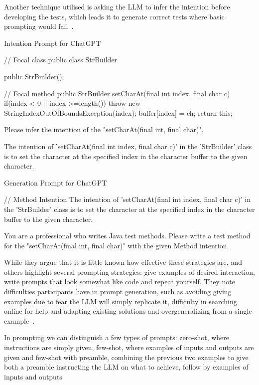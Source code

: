 Another technique utilised is asking the LLM to infer the intention before developing the tests, which leads it to generate correct tests where basic prompting would fail~\cite{kn:chattester}.

\begin{prompt}
Intention Prompt for ChatGPT

// Focal class
public class StrBuilder {
  public StrBuilder();

  // Focal method
  public StrBuilder setCharAt(final int index, final char c){
    if(index < 0 || index >=length()) {
      throw new StringIndexOutOfBoundsException(index);
    }
    buffer[index] = ch; return this;
  }
}

Please infer the intention of the "setCharAt(final int, final char)".
\end{prompt}

\begin{response}
The intention of 'setCharAt(final int index, final char c)' in the 'StrBuilder' class is to set the character at the specified index in the character buffer to the given character.
\end{response}

\begin{prompt}
Generation Prompt for ChatGPT

// Method Intention
The intention of 'setCharAt(final int index, final char c)' in the 'StrBuilder' class is to set the character at the specified index in the character buffer to the given character.

You are a professional who writes Java test methods.
Please write a test method for the "setCharAt(final int, final char)" with the given Method intention.
\end{prompt}

While they argue that it is little known how effective these strategies are, \citet{kn:johnny} and others highlight several prompting strategies: give examples of desired interaction, write prompts that look somewhat like code and repeat yourself. They note difficulties participants have in prompt generation, such as avoiding giving examples due to fear the LLM will simply replicate it, difficulty in searching online for help and adapting existing solutions and overgeneralizing from a single example~\cite{kn:johnny}.

In prompting we can distinguish a few types of prompts: zero-shot, where instructions are simply given, few-shot, where examples of inputs and outputs are given and few-shot with preamble, combining the previous two examples to give both a preamble instructing the LLM on what to achieve, follow by examples of inputs and outputs~\cite{kn:promptprofiannaca}

